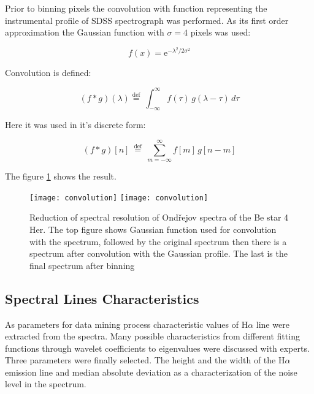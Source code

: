 Prior to binning pixels the convolution with function representing the
instrumental profile of SDSS spectrograph was performed. As its first
order approximation the Gaussian function with $\sigma = 4$ pixels was
used:


\begin{equation}
  \label{eq:gauss}
  f(x) =  \mathrm{e}^{-\lambda^2/2\sigma^2}
\end{equation}

 Convolution is defined:

\begin{equation}
  \label{eq:convolution}
  (f * g )(\lambda) \stackrel{\mathrm{def}}{=}\ \int_{-\infty}^{\infty} f(\tau)\, g(\lambda - \tau)\, d\tau
\end{equation}
 
Here it was used in it's discrete form:

\begin{equation}
  \label{eq:discreteConvolution}
  (f * g)[n]\ \stackrel{\mathrm{def}}{=}\ \sum_{m=-\infty}^{\infty} f[m]\, g[n - m]
\end{equation}


The figure \ref{FigReduction} shows the result.

    \begin{figure}[!htbp]
      \begin{center}
        \leavevmode
        \ifpdf
        \texttt{[image: convolution]}
        \else
        \texttt{[image: convolution]}
        \fi
        \caption{Reduction of spectral resolution of Ond\v{r}ejov
          spectra of the Be star 4 Her. The top figure shows Gaussian
          function used for convolution with the spectrum, followed by
          the original spectrum then there is a spectrum after
          convolution with the Gaussian profile. The last is the final
          spectrum after binning}
        \label{FigReduction}
      \end{center}
    \end{figure}





\subsection{Spectral Lines Characteristics}
As parameters for data mining process characteristic values of
H$\alpha$ line were extracted from the spectra. Many possible
characteristics from different fitting functions through wavelet
coefficients to eigenvalues were discussed with experts. Three
parameters were finally selected. The height and the width of the
H$\alpha$ emission line and median absolute deviation as a
characterization of the noise level in the spectrum.


